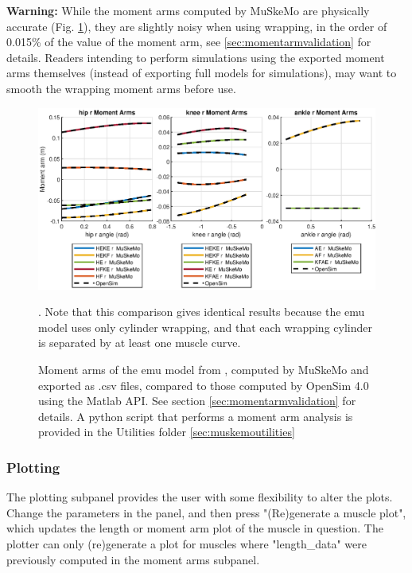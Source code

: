 \documentclass{article}
\begin{document}
\textbf{Warning:} While the moment arms computed by MuSkeMo are physically accurate (Fig. \ref{fig:momentarmscombined}), they are slightly noisy when using wrapping, in the order of 0.015\% of the value of the moment arm, see \ref{sec:momentarmvalidation} for details. Readers intending to perform simulations using the exported moment arms themselves (instead of exporting full models for simulations), may want to smooth the wrapping moment arms before use.

\begin{figure}[htb]
    \centering
    \includegraphics[width=1\textwidth]{figures/HKA_momentarms_emu.eps} %
    \caption{Moment arms of the emu model from \cite{vanbijlertMusclecontrolledPhysicsSimulations2024a}, computed by MuSkeMo and exported as .csv files, compared to those computed by OpenSim 4.0 using the Matlab API. See section \ref{sec:momentarmvalidation} for details. A python script that performs a moment arm analysis is provided in the Utilities folder \ref{sec:muskemoutilities}}. Note that this comparison gives identical results because the emu model uses only cylinder wrapping, and that each wrapping cylinder is separated by at least one muscle curve.
    \label{fig:momentarmscombined}
\end{figure}


\subsubsection{Plotting}
\label{sec:plotting}

The plotting subpanel provides the user with some flexibility to alter the plots. Change the parameters in the panel, and then press "(Re)generate a muscle plot", which updates the length or moment arm plot of the muscle in question. The plotter can only (re)generate a plot for muscles where "length\_data" were previously computed in the moment arms subpanel.
\end{document}
